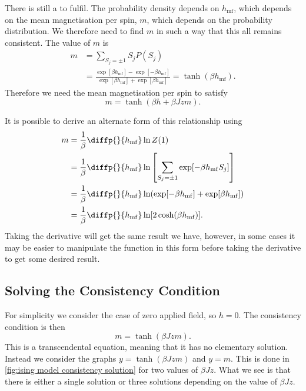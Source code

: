 \documentclass[fleqn]{NotesClass}
\begin{document}
    There is still a  to fulfil.
    The probability density depends on \(h_{\mathrm{mf}}\), which depends on the mean magnetisation per spin, \(m\), which depends on the probability distribution.
    We therefore need to find \(m\) in such a way that this all remains consistent.
    The value of \(m\) is
    \begin{align}
        m &= \sum_{S_j = \pm 1} S_jP(S_j)\\
        &= \frac{\exp[\beta h_{\mathrm{mf}}] - \exp[-\beta h_{\mathrm{mf}}]}{\exp[\beta h_{\mathrm{mf}}] + \exp[\beta h_{\mathrm{mf}}]} = \tanh(\beta h_{\mathrm{mf}}).
    \end{align}
    Therefore we need the mean magnetisation per spin to satisfy
    \begin{equation}
        m = \tanh(\beta h + \beta Jzm).
    \end{equation}
    
    It is possible to derive an alternate form of this relationship using
    \begin{align}
        m &= \frac{1}{\beta} \diffp{}{h_{\mathrm{mf}}} \ln Z(1)\\
        &= \frac{1}{\beta} \diffp{}{h_{\mathrm{mf}}} \ln\left[ \sum_{S_j = \pm 1} \exp[-\beta h_{\mathrm{mf}}S_j] \right]\\
        &= \frac{1}{\beta} \diffp{}{h_{\mathrm{mf}}} \ln( \exp[-\beta h_{\mathrm{mf}}] + \exp[\beta h_{\mathrm{mf}}] )\\
        &= \frac{1}{\beta} \diffp{}{h_{\mathrm{mf}}} \ln[2\cosh(\beta h_{\mathrm{mf}})].
    \end{align}
    Taking the derivative will get the same result we have, however, in some cases it may be easier to manipulate the function in this form before taking the derivative to get some desired result.
    
    \subsection{Solving the Consistency Condition}
    For simplicity we consider the case of zero applied field, so \(h = 0\).
    The consistency condition is then
    \begin{equation}
        m = \tanh(\beta Jzm).
    \end{equation}
    This is a transcendental equation, meaning that it has no elementary solution.
    Instead we consider the graphs \(y = \tanh(\beta Jzm)\) and \(y = m\).
    This is done in \cref{fig:ising model consistency solution} for two values of \(\beta Jz\).
    What we see is that there is either a single solution or three solutions depending on the value of \(\beta Jz\).
    
\end{document}
